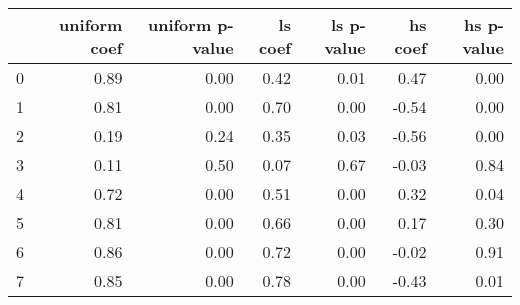 \begin{tabular}{lrrrrrr}
\toprule
 & uniform coef & uniform p-value & ls coef & ls p-value & hs coef & hs p-value \\
\midrule
0 & 0.89 & 0.00 & 0.42 & 0.01 & 0.47 & 0.00 \\
1 & 0.81 & 0.00 & 0.70 & 0.00 & -0.54 & 0.00 \\
2 & 0.19 & 0.24 & 0.35 & 0.03 & -0.56 & 0.00 \\
3 & 0.11 & 0.50 & 0.07 & 0.67 & -0.03 & 0.84 \\
4 & 0.72 & 0.00 & 0.51 & 0.00 & 0.32 & 0.04 \\
5 & 0.81 & 0.00 & 0.66 & 0.00 & 0.17 & 0.30 \\
6 & 0.86 & 0.00 & 0.72 & 0.00 & -0.02 & 0.91 \\
7 & 0.85 & 0.00 & 0.78 & 0.00 & -0.43 & 0.01 \\
\bottomrule
\end{tabular}
